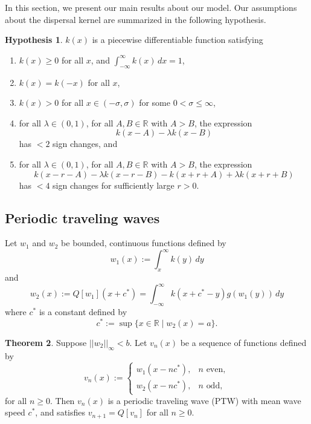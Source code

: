 \documentclass[11pt]{article}
\theoremstyle{definition}
\newtheorem{thm}{Theorem}
\newtheorem{hyp}[thm]{Hypothesis}
\numberwithin{equation}{section}
\numberwithin{thm}{section}
\renewcommand{\a}{a}
\renewcommand{\b}{b}
\begin{document}
In this section, we present our main results about our model. Our assumptions about the dispersal kernel are summarized in the following hypothesis.

\begin{hyp}
$k(x)$ is a piecewise differentiable function satisfying
\begin{enumerate}[(H1)]
\item $k(x) \geq 0$ for all $x$, and $\int_{-\infty}^{\infty} k(x) \, dx = 1$, \label{h1}

\item $k(x)=k(-x)$ for all $x$,\label{h2}

\item $k(x)>0$ for all $x \in (-\sigma,\sigma)$ for some $0 < \sigma \leq \infty$,\label{h3}

\item  \label{h4}
for all $\lambda \in (0,1)$, for all $A,B\in\mathbb R$ with $A>B$, the expression
$$
k(x-A) - \lambda k(x-B)
$$
has $<2$ sign changes, and

\item \label{h5}
for all $\lambda \in (0,1)$, for all $A,B\in\mathbb R$ with $A>B$, the expression
$$
k(x-r-A) - \lambda k(x-r-B) - k(x+r+A) + \lambda k(x+r+B)
$$
has $<4$ sign changes for sufficiently large $r>0$.
\end{enumerate}
\end{hyp}



\subsection{Periodic traveling waves}

Let $w_1$ and $w_2$ be bounded, continuous functions defined by
\begin{equation} \label{w1}
w_1(x) :=\int_x^\infty k(y) \, dy
\end{equation}
and
\begin{equation} \label{w2}
w_2(x) := Q[w_1](x+c^*) =  \int_{-\infty}^{\infty} k(x+c^*-y) g(w_1(y)) \, dy
\end{equation}
where $c^*$ is a constant defined by
\begin{equation} \label{c}
c^* := \sup \{ x\in\mathbb R \mid w_2(x) = \a \}.
\end{equation}

\begin{thm} \label{theorem1}
Suppose $||w_2||_\infty < \b$. Let $v_n(x)$ be a sequence of functions defined by
\begin{equation}\label{ptw}
v_n(x) := \begin{cases}
w_1(x-nc^*), & n \text{ even}, \\
w_2(x-nc^*), & n \text{ odd},
\end{cases}
\end{equation}
for all $n \geq 0$. Then $v_n(x)$ is a periodic traveling wave (PTW) with mean wave speed $c^*$, and satisfies $v_{n+1}=Q[v_n]$ for all $n\geq0$.
\end{thm}
\end{document}
